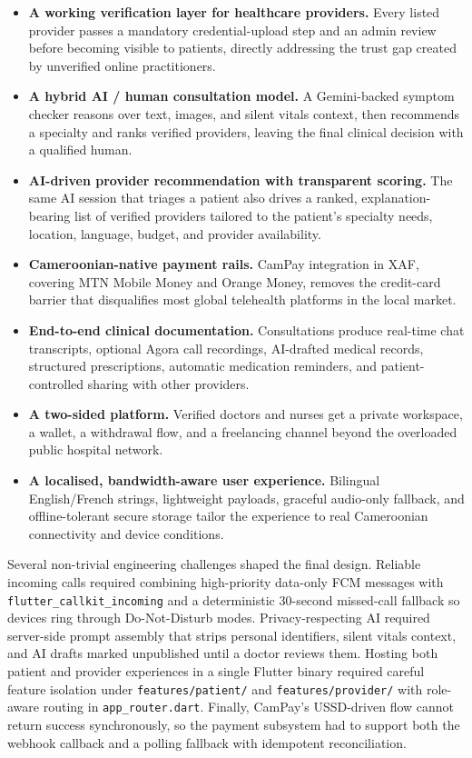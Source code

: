 \begin{itemize}
  \item \textbf{A working verification layer for healthcare providers.} Every listed provider passes a mandatory credential-upload step and an admin review before becoming visible to patients, directly addressing the trust gap created by unverified online practitioners.
  \item \textbf{A hybrid AI / human consultation model.} A Gemini-backed symptom checker reasons over text, images, and silent vitals context, then recommends a specialty and ranks verified providers, leaving the final clinical decision with a qualified human.
  \item \textbf{AI-driven provider recommendation with transparent scoring.} The same AI session that triages a patient also drives a ranked, explanation-bearing list of verified providers tailored to the patient's specialty needs, location, language, budget, and provider availability.
  \item \textbf{Cameroonian-native payment rails.} CamPay integration in XAF, covering MTN Mobile Money and Orange Money, removes the credit-card barrier that disqualifies most global telehealth platforms in the local market.
  \item \textbf{End-to-end clinical documentation.} Consultations produce real-time chat transcripts, optional Agora call recordings, AI-drafted medical records, structured prescriptions, automatic medication reminders, and patient-controlled sharing with other providers.
  \item \textbf{A two-sided platform.} Verified doctors and nurses get a private workspace, a wallet, a withdrawal flow, and a freelancing channel beyond the overloaded public hospital network.
  \item \textbf{A localised, bandwidth-aware user experience.} Bilingual English/French strings, lightweight payloads, graceful audio-only fallback, and offline-tolerant secure storage tailor the experience to real Cameroonian connectivity and device conditions.
\end{itemize}

Several non-trivial engineering challenges shaped the final design. Reliable incoming calls required combining high-priority data-only FCM messages with \texttt{flutter\_callkit\_incoming} and a deterministic 30-second missed-call fallback so devices ring through Do-Not-Disturb modes. Privacy-respecting AI required server-side prompt assembly that strips personal identifiers, silent vitals context, and AI drafts marked unpublished until a doctor reviews them. Hosting both patient and provider experiences in a single Flutter binary required careful feature isolation under \texttt{features/patient/} and \texttt{features/provider/} with role-aware routing in \texttt{app\_router.dart}. Finally, CamPay's USSD-driven flow cannot return success synchronously, so the payment subsystem had to support both the webhook callback and a polling fallback with idempotent reconciliation.

